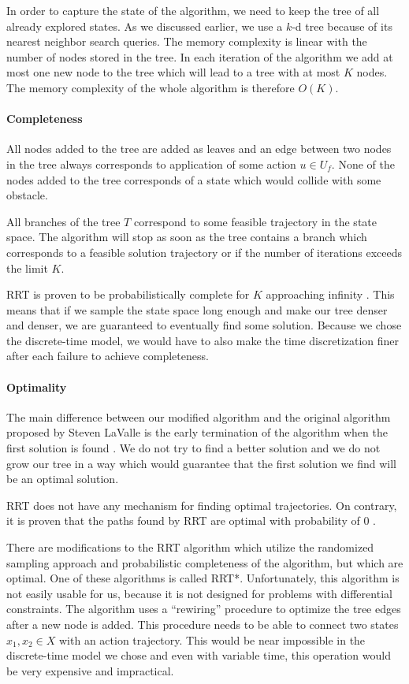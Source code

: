 In order to capture the state of the algorithm, we need to keep the tree of all already explored states. As we discussed earlier, we use a $k$-d tree because of its nearest neighbor search queries. The memory complexity is linear with the number of nodes stored in the tree. In each iteration of the algorithm we add at most one new node to the tree which will lead to a tree with at most $K$ nodes. The memory complexity of the whole algorithm is therefore $O(K)$.

\paragraph{Completeness}

All nodes added to the tree are added as leaves and an edge between two nodes in the tree always corresponds to application of some action $u\in U_f$. None of the nodes added to the tree corresponds of a state which would collide with some obstacle.

All branches of the tree $T$ correspond to some feasible trajectory in the state space. The algorithm will stop as soon as the tree contains a branch which corresponds to a feasible solution trajectory or if the number of iterations exceeds the limit $K$.

\gls*{RRT} is proven to be probabilistically complete for $K$ approaching infinity \cite{RRT_star}. This means that if we sample the state space long enough and make our tree denser and denser, we are guaranteed to eventually find some solution. Because we chose the discrete-time model, we would have to also make the time discretization finer after each failure to achieve completeness.

\paragraph{Optimality}

The main difference between our modified algorithm and the original algorithm proposed by Steven LaValle is the early termination of the algorithm when the first solution is found \cite{RRT}. We do not try to find a better solution and we do not grow our tree in a way which would guarantee that the first solution we find will be an optimal solution.

\gls*{RRT} does not have any mechanism for finding optimal trajectories. On contrary, it is proven that the paths found by \gls*{RRT} are optimal with probability of 0 \cite{RRT_star}.

There are modifications to the \gls*{RRT} algorithm which utilize the randomized sampling approach and probabilistic completeness of the algorithm, but which are optimal. One of these algorithms is called \gls{RRT*}. Unfortunately, this algorithm is not easily usable for us, because it is not designed for problems with differential constraints. The algorithm uses a ``rewiring'' procedure to optimize the tree edges after a new node is added. This procedure needs to be able to connect two states $x_1, x_2\in X$ with an action trajectory. This would be near impossible in the discrete-time model we chose and even with variable time, this operation would be very expensive and impractical.

